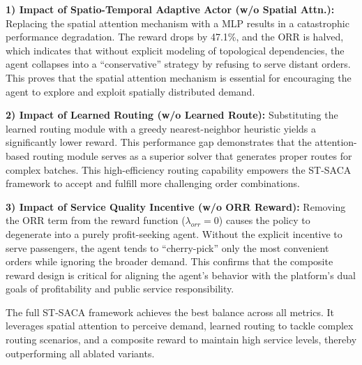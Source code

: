 \documentclass[lettersize,journal]{IEEEtran}
\begin{document}
\textbf{1) Impact of Spatio-Temporal Adaptive Actor (w/o Spatial Attn.):} 
Replacing the spatial attention mechanism with a MLP results in a catastrophic performance degradation. The reward drops by 47.1\%, and the ORR is halved, which indicates that without explicit modeling of topological dependencies, the agent collapses into a ``conservative'' strategy by refusing to serve distant orders. This proves that the spatial attention mechanism is essential for encouraging the agent to explore and exploit spatially distributed demand.

\textbf{2) Impact of Learned Routing (w/o Learned Route):} 
Substituting the learned routing module with a greedy nearest-neighbor heuristic yields a significantly lower reward. This performance gap demonstrates that the attention-based routing module serves as a superior solver that generates proper routes for complex batches. This high-efficiency routing capability empowers the ST-SACA framework to accept and fulfill more challenging order combinations.

\textbf{3) Impact of Service Quality Incentive (w/o ORR Reward):} 
Removing the ORR term from the reward function ($\lambda_{orr}=0$) causes the policy to degenerate into a purely profit-seeking agent. Without the explicit incentive to serve passengers, the agent tends to ``cherry-pick'' only the most convenient orders while ignoring the broader demand. This confirms that the composite reward design is critical for aligning the agent's behavior with the platform's dual goals of profitability and public service responsibility.

The full ST-SACA framework achieves the best balance across all metrics. It leverages spatial attention to perceive demand, learned routing to tackle complex routing scenarios, and a composite reward to maintain high service levels, thereby outperforming all ablated variants.

\begin{table}[htbp]
\caption{\textcolor{blue}{Comparison of ST-SACA Variants}}
\label{tab:ablation}
\begin{center}
\color{blue}
\end{center}
\end{table}
\end{document}
